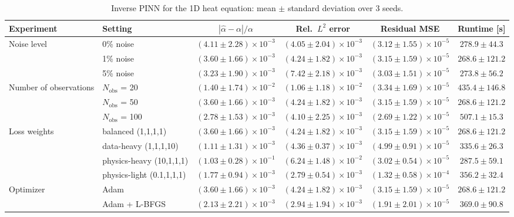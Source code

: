\begin{table}[htbp]
\centering
\small
\caption{Inverse PINN for the 1D heat equation: mean $\pm$ standard deviation over 3 seeds.}
\label{tab:inverse-pinn-heat}
\begin{tabular}{llcccc}
\toprule
Experiment & Setting & $|\hat\alpha-\alpha|/\alpha$ & Rel.\ $L^2$ error & Residual MSE & Runtime [s] \\
\midrule
Noise level & 0\% noise & $(4.11 \pm 2.28)\times 10^{-3}$ & $(4.05 \pm 2.04)\times 10^{-3}$ & $(3.12 \pm 1.55)\times 10^{-5}$ & $278.9 \pm 44.3$ \\
 & 1\% noise & $(3.60 \pm 1.66)\times 10^{-3}$ & $(4.24 \pm 1.82)\times 10^{-3}$ & $(3.15 \pm 1.59)\times 10^{-5}$ & $268.6 \pm 121.2$ \\
 & 5\% noise & $(3.23 \pm 1.90)\times 10^{-3}$ & $(7.42 \pm 2.18)\times 10^{-3}$ & $(3.03 \pm 1.51)\times 10^{-5}$ & $273.8 \pm 56.2$ \\
\midrule
Number of observations & $N_{\mathrm{obs}}$ = 20 & $(1.40 \pm 1.74)\times 10^{-2}$ & $(1.06 \pm 1.18)\times 10^{-2}$ & $(3.34 \pm 1.69)\times 10^{-5}$ & $435.4 \pm 146.8$ \\
 & $N_{\mathrm{obs}}$ = 50 & $(3.60 \pm 1.66)\times 10^{-3}$ & $(4.24 \pm 1.82)\times 10^{-3}$ & $(3.15 \pm 1.59)\times 10^{-5}$ & $268.6 \pm 121.2$ \\
 & $N_{\mathrm{obs}}$ = 100 & $(2.78 \pm 1.53)\times 10^{-3}$ & $(4.10 \pm 2.25)\times 10^{-3}$ & $(2.69 \pm 1.22)\times 10^{-5}$ & $507.1 \pm 15.3$ \\
\midrule
Loss weights & balanced (1,1,1,1) & $(3.60 \pm 1.66)\times 10^{-3}$ & $(4.24 \pm 1.82)\times 10^{-3}$ & $(3.15 \pm 1.59)\times 10^{-5}$ & $268.6 \pm 121.2$ \\
 & data-heavy (1,1,1,10) & $(1.11 \pm 1.31)\times 10^{-3}$ & $(4.36 \pm 0.37)\times 10^{-3}$ & $(4.99 \pm 0.91)\times 10^{-5}$ & $335.6 \pm 26.3$ \\
 & physics-heavy (10,1,1,1) & $(1.03 \pm 0.28)\times 10^{-1}$ & $(6.24 \pm 1.48)\times 10^{-2}$ & $(3.02 \pm 0.54)\times 10^{-5}$ & $287.5 \pm 59.1$ \\
 & physics-light (0.1,1,1,1) & $(1.77 \pm 0.94)\times 10^{-3}$ & $(2.79 \pm 0.54)\times 10^{-3}$ & $(1.32 \pm 0.58)\times 10^{-4}$ & $356.2 \pm 32.4$ \\
\midrule
Optimizer & Adam & $(3.60 \pm 1.66)\times 10^{-3}$ & $(4.24 \pm 1.82)\times 10^{-3}$ & $(3.15 \pm 1.59)\times 10^{-5}$ & $268.6 \pm 121.2$ \\
 & Adam + L-BFGS & $(2.13 \pm 2.21)\times 10^{-3}$ & $(2.94 \pm 1.94)\times 10^{-3}$ & $(1.91 \pm 2.01)\times 10^{-5}$ & $369.0 \pm 90.8$ \\
\bottomrule
\end{tabular}
\end{table}
